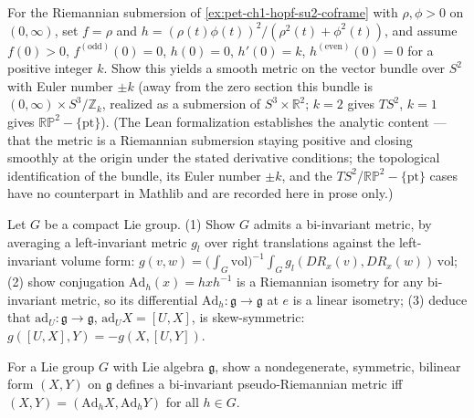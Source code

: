 \begin{remark}
  \label{rem:pet-ch1-ex-23}
  \leanok
  For the Riemannian submersion of \cref{ex:pet-ch1-hopf-su2-coframe} with
  $\rho,\phi>0$ on $(0,\infty)$, set $f=\rho$ and
  $h=(\rho(t)\phi(t))^2/(\rho^2(t)+\phi^2(t))$, and assume $f(0)>0$,
  $f^{(\mathrm{odd})}(0)=0$, $h(0)=0$, $h'(0)=k$, $h^{(\mathrm{even})}(0)=0$ for a
  positive integer $k$. Show this yields a smooth metric on the vector bundle
  over $S^2$ with Euler number $\pm k$ (away from the zero section this bundle
  is $(0,\infty)\times S^3/\mathbb{Z}_k$, realized as a submersion of $S^3\times\mathbb{R}^2$;
  $k=2$ gives $TS^2$, $k=1$ gives $\mathbb{RP}^2-\{\mathrm{pt}\}$).
  (The Lean formalization establishes the analytic content — that the metric is a
  Riemannian submersion staying positive and closing smoothly at the origin under
  the stated derivative conditions; the topological identification of the bundle,
  its Euler number $\pm k$, and the $TS^2$/$\mathbb{RP}^2-\{\mathrm{pt}\}$ cases
  have no counterpart in Mathlib and are recorded here in prose only.)
\end{remark}

\begin{remark}
  \label{rem:pet-ch1-ex-24}
  \leanok
  Let $G$ be a compact Lie group. (1) Show $G$ admits a bi-invariant metric, by
  averaging a left-invariant metric $g_l$ over right translations against the
  left-invariant volume form:
  $g(v,w)=\big(\int_G\mathrm{vol}\big)^{-1}\int_Gg_l(DR_x(v),DR_x(w))\,\mathrm{vol}$;
  (2) show conjugation $\mathrm{Ad}_h(x)=hxh^{-1}$ is a Riemannian isometry for
  any bi-invariant metric, so its differential $\mathrm{Ad}_h:\mathfrak g\to\mathfrak g$
  at $e$ is a linear isometry; (3) deduce that
  $\mathrm{ad}_U:\mathfrak g\to\mathfrak g$, $\mathrm{ad}_UX=[U,X]$, is skew-symmetric:
  $g([U,X],Y)=-g(X,[U,Y])$.
\end{remark}

\begin{remark}
  \label{rem:pet-ch1-ex-25}
  \leanok
  For a Lie group $G$ with Lie algebra $\mathfrak g$, show a nondegenerate,
  symmetric, bilinear form $(X,Y)$ on $\mathfrak g$ defines a bi-invariant
  pseudo-Riemannian metric iff $(X,Y)=(\mathrm{Ad}_hX,\mathrm{Ad}_hY)$ for all
  $h\in G$.
\end{remark}

